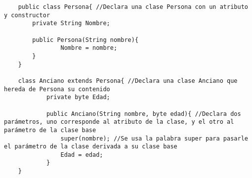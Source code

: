 \begin{lstlisting}
    public class Persona{ //Declara una clase Persona con un atributo y constructor
        private String Nombre;
        
        public Persona(String nombre){
        		Nombre = nombre;
        }
    }
    
    class Anciano extends Persona{ //Declara una clase Anciano que hereda de Persona su contenido
    		private byte Edad;
    		
    		public Anciano(String nombre, byte edad){ //Declara dos parámetros, uno corresponde al atributo de la clase, y el otro al parámetro de la clase base
    			super(nombre); //Se usa la palabra super para pasarle el parámetro de la clase derivada a su clase base
    			Edad = edad;
    		}
    }
\end{lstlisting}

